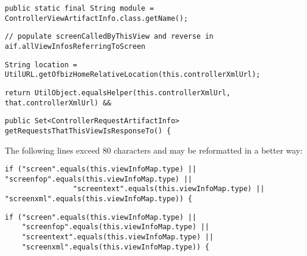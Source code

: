 \begin{lstlisting}[firstnumber=36, caption={Line 36 acceptable violation of the rule}]
public static final String module = ControllerViewArtifactInfo.class.getName();
\end{lstlisting}
\noindent\makebox[\linewidth]{\rule{\linewidth}{0.4pt}}
\begin{lstlisting}[firstnumber=59, caption={Line 59 acceptable violation of the rule}]
// populate screenCalledByThisView and reverse in aif.allViewInfosReferringToScreen
\end{lstlisting}
\noindent\makebox[\linewidth]{\rule{\linewidth}{0.4pt}}
\begin{lstlisting}[firstnumber=84, caption={Line 84 acceptable violation of the rule}]
String location = UtilURL.getOfbizHomeRelativeLocation(this.controllerXmlUrl);
\end{lstlisting}
\noindent\makebox[\linewidth]{\rule{\linewidth}{0.4pt}}
\begin{lstlisting}[firstnumber=115, caption={Line 115 acceptable violation of the rule}]
return UtilObject.equalsHelper(this.controllerXmlUrl, that.controllerXmlUrl) &&
\end{lstlisting}
\noindent\makebox[\linewidth]{\rule{\linewidth}{0.4pt}}
\begin{lstlisting}[firstnumber=122, caption={Line 122 acceptable violation of the rule}]
public Set<ControllerRequestArtifactInfo> getRequestsThatThisViewIsResponseTo() {
\end{lstlisting}

The following lines exceed 80 characters and may be reformatted in a better way:
\begin{lstlisting}[firstnumber=60, caption={Line 60 violation of the rule}]
if ("screen".equals(this.viewInfoMap.type) || "screenfop".equals(this.viewInfoMap.type) ||
                "screentext".equals(this.viewInfoMap.type) || "screenxml".equals(this.viewInfoMap.type)) {
\end{lstlisting}
\begin{lstlisting}[firstnumber=60, caption={Line 60 possible solution}]
if ("screen".equals(this.viewInfoMap.type) ||
    "screenfop".equals(this.viewInfoMap.type) ||
    "screentext".equals(this.viewInfoMap.type) ||
    "screenxml".equals(this.viewInfoMap.type)) {
\end{lstlisting}

